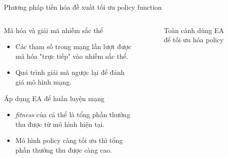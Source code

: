 	\begin{frame}{Phương pháp tiến hóa đề xuất tối ưu policy function}
		\begin{columns}
        \begin{itemize}
    		\begin{block}{Mã hóa và giải mã nhiễm sắc thể}
    		    \begin{itemize}
    		    \setlength\itemsep{0.01em}
    		    \item Các tham số trong mạng lần lượt được mã hóa "trực tiếp" vào nhiễm sắc thể.
    		    \item Quá trình giải mã ngược lại để đánh giá mô hình mạng.
    		    \end{itemize}
    		\end{block}
    		\begin{block}{Áp dụng EA để huấn luyện mạng}
    		    \begin{itemize}
    		    \setlength\itemsep{0.01em}
    		    \item \emph{fitness} của cá thể là tổng phần thưởng thu được từ mô hình hiện tại.
    		    \item Mô hình policy càng tối ưu thì tổng phần thưởng thu được càng cao.
    		    \end{itemize}
    		\end{block}
		\end{itemize}
		\begin{figure}[ht]
            \centering
            \caption{Mã hóa và giải mã policy.}
            \label{fig:problem:policy}
            \caption{Toàn cảnh dùng EA để tối ưu hóa policy}
        \end{figure}
		\end{columns}
	\end{frame}